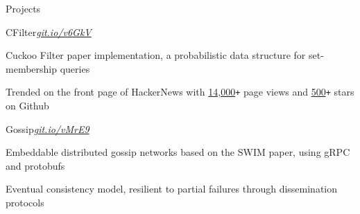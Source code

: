 \documentclass{resume} %
\begin{document}
\begin{rSection}{Projects}
  \begin{rSubsection}{CFilter}{\em{\href{https://git.io/v6GkV}{git.io/v6GkV}}}{}

    \item Cuckoo Filter paper implementation, a probabilistic data structure for
      set-membership queries
    \item Trended on the front page of HackerNews with \underline{14,000}\texttt{+} page
      views and \underline{500}\texttt{+} stars on Github
  \end{rSubsection}

  \begin{rSubsection}{Gossip}{\em{\href{https://git.io/vMrE9}{git.io/vMrE9}}}{}

    \item Embeddable distributed gossip networks based on the SWIM paper, using
      gRPC and protobufs
    \item Eventual consistency model, resilient to partial failures through dissemination protocols
  \end{rSubsection}






\end{rSection}
\end{document}
